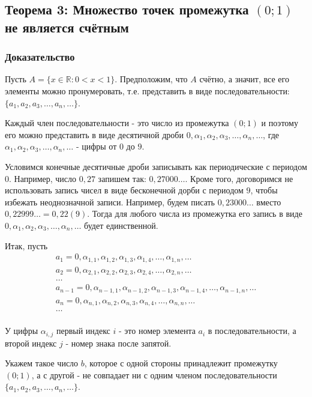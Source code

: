 \documentclass{article}
\begin{document}
\subsection{Теорема 3: Множество точек промежутка $(0; 1)$ не является счётным}

\subsubsection*{Доказательство}

Пусть $A = \{x \in \mathbb{R} : 0 < x < 1\}$. Предположим, что $A$ счётно, а значит, все его элементы можно пронумеровать, т.е. представить в виде последовательности: $\{a_1, a_2, a_3, \dots, a_n, \dots\}$.

Каждый член последовательности - это число из промежутка $(0; 1)$ и поэтому его можно представить в виде десятичной дроби $0, \alpha_1, \alpha_2, \alpha_3, \dots, \alpha_n, \dots$, где $\alpha_1, \alpha_2, \alpha_3, \dots, \alpha_n, \dots$ - цифры от $0$ до $9$.

Условимся конечные десятичные дроби записывать как периодические с периодом $0$. Например, число $0,27$ запишем так: $0,27000\dots$. Кроме того, договоримся не использовать запись чисел в виде бесконечной дорби с периодом $9$, чтобы избежать неоднозначной записи. Например, будем писать $0,23000\dots$ вместо $0,22999\dots = 0,22(9)$. Тогда для любого числа из промежутка его запись в виде $0, \alpha_1, \alpha_2, \alpha_3, \dots, \alpha_n, \dots$ будет единственной.

Итак, пусть \begin{gather*}
a_1 = 0, \alpha_{1, 1}, \alpha_{1, 2}, \alpha_{1, 3}, \alpha_{1, 4}, \dots, \alpha_{1, n}, \dots \\
a_2 = 0, \alpha_{2, 1}, \alpha_{2, 2}, \alpha_{2, 3}, \alpha_{2, 4}, \dots, \alpha_{2, n}, \dots \\
\dots \\
a_{n-1} = 0, \alpha_{n-1, 1}, \alpha_{n-1, 2}, \alpha_{n-1, 3}, \alpha_{n-1, 4}, \dots, \alpha_{n-1, n}, \dots \\
a_n = 0, \alpha_{n, 1}, \alpha_{n, 2}, \alpha_{n, 3}, \alpha_{n, 4}, \dots, \alpha_{n, n}, \dots \\
\dots \\
\end{gather*}

У цифры $\alpha_{i, j}$ первый индекс $i$ - это номер элемента $a_i$ в последовательности, а второй индекс $j$ - номер знака после запятой.

Укажем такое число $b$, которое с одной стороны принадлежит промежутку $(0; 1)$, а с другой - не совпадает ни с одним членом последовательности $\{a_1, a_2, a_3, \dots, a_n, \dots \}$.
\end{document}
